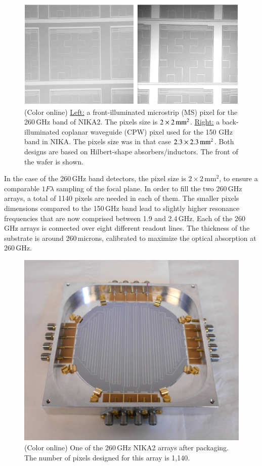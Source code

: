 \documentclass[]{aa} %
\begin{document}
\begin{figure}[h]
   \centering
    \includegraphics[width=.95\linewidth]{CPWeMS.png}
      \caption{(Color online) \underline{Left:} a front-illuminated microstrip (MS) pixel for the 260\,GHz band of NIKA2. The pixels size is $2\times2\textrm{\,mm}^2$. \underline{Right:} a back-illuminated coplanar waveguide (CPW) pixel used for the 150 GHz band in NIKA. The pixels size was in that case $2.3\times2.3\textrm{\,mm}^2$. Both designs are based on Hilbert-shape absorbers/inductors. The front of the wafer is shown.}
         \label{Pixels}
\end{figure}

In the case of the 260\,GHz band detectors, the pixel size is $2\times 2\mathrm{\,mm}^2$, to ensure a comparable $1 F \lambda$ sampling of the focal plane. In order to fill the two 260\,GHz arrays, a total of 1140 pixels are needed in each of them. The smaller pixels dimensions compared to the 150\,GHz band lead to slightly higher resonance frequencies that are now comprised between 1.9 and 2.4\,GHz. Each of the 260\,GHz arrays is connected over eight different readout lines. The thickness of the substrate is around 260\,microns, calibrated to maximize the optical absorption at 260\,GHz. 

\begin{figure}[h]
   \centering
    \includegraphics[width=.95\linewidth]{1mm_array.jpg}
      \caption{(Color online) One of the 260\,GHz NIKA2 arrays after packaging. The number of pixels designed for this array is 1,140.}
         \label{Array}
\end{figure}
\end{document}
